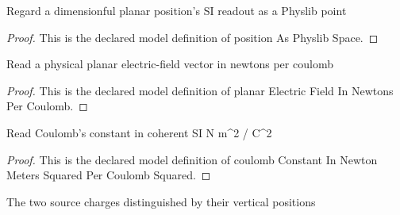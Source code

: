 \begin{definition}
  \label{def:physics:phyx-mini-0915:phyxminiproblems-problemphyxmini0915-positionasphyslibspace}
  Regard a dimensionful planar position's SI readout as a Physlib point
\end{definition}
\begin{proof}
  This is the declared model definition of position As Physlib Space.
\end{proof}
\begin{definition}
  \label{def:physics:phyx-mini-0915:phyxminiproblems-problemphyxmini0915-planarelectricfieldinnewtonspercoulomb}
  Read a physical planar electric-field vector in newtons per coulomb
\end{definition}
\begin{proof}
  This is the declared model definition of planar Electric Field In Newtons Per Coulomb.
\end{proof}
\begin{definition}
  \label{def:physics:phyx-mini-0915:phyxminiproblems-problemphyxmini0915-coulombconstantinnewtonmeterssquaredpercoulombsquared}
  Read Coulomb's constant in coherent SI N m\textasciicircum{}2 / C\textasciicircum{}2
\end{definition}
\begin{proof}
  This is the declared model definition of coulomb Constant In Newton Meters Squared Per Coulomb Squared.
\end{proof}
\begin{definition}
  \label{def:physics:phyx-mini-0915:phyxminiproblems-problemphyxmini0915-chargesource}
  The two source charges distinguished by their vertical positions
\end{definition}
